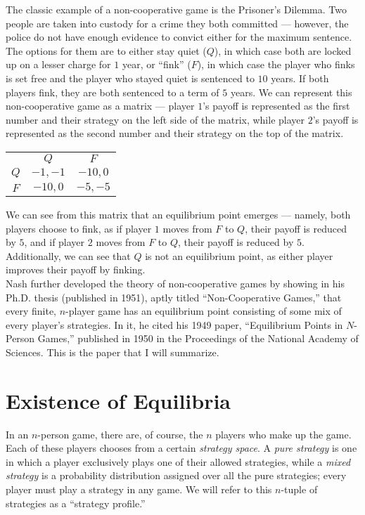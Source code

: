 \documentclass[12pt]{extarticle}
\begin{document}
  The classic example of a non-cooperative game is the Prisoner's Dilemma. Two people are taken into custody for a crime they both committed --- however, the police do not have enough evidence to convict either for the maximum sentence. The options for them are to either stay quiet ($Q$), in which case both are locked up on a lesser charge for $1$ year, or ``fink'' ($F$), in which case the player who finks is set free and the player who stayed quiet is sentenced to $10$ years. If both players fink, they are both sentenced to a term of $5$ years. We can represent this non-cooperative game as a matrix --- player $1$'s payoff is represented as the first number and their strategy on the left side of the matrix, while player $2$'s payoff is represented as the second number and their strategy on the top of the matrix.
  \begin{center}
    \begin{tabular}{c|c|c|}
      \multicolumn{1}{c}{} & \multicolumn{1}{c}{$Q$} & \multicolumn{1}{c}{$F$}\\
      \cline{2-3}
      $Q$ & $-1,-1$ & $-10,0$\\
      \cline{2-3}
      $F$ & $-10,0$ & $-5,-5$\\
      \cline{2-3}
    \end{tabular}
  \end{center}
  We can see from this matrix that an equilibrium point emerges --- namely, both players choose to fink, as if player $1$ moves from $F$ to $Q$, their payoff is reduced by $5$, and if player $2$ moves from $F$ to $Q$, their payoff is reduced by $5$. Additionally, we can see that $Q$ is not an equilibrium point, as either player improves their payoff by finking.\\

  Nash further developed the theory of non-cooperative games by showing in his Ph.D. thesis (published in 1951), aptly titled ``Non-Cooperative Games,''\supercite{nash_non-cooperative_1951} that every finite, $n$-player game has an equilibrium point consisting of some mix of every player's strategies. In it, he cited his 1949 paper, ``Equilibrium Points in $N$-Person Games,''\supercite{nash_equilibrium_1950} published in 1950 in the Proceedings of the National Academy of Sciences. This is the paper that I will summarize.
  \section*{Existence of Equilibria}%
  In an $n$-person game, there are, of course, the $n$ players who make up the game. Each of these players chooses from a certain \textit{strategy space}. A \textit{pure strategy} is one in which a player exclusively plays one of their allowed strategies, while a \textit{mixed strategy} is a probability distribution assigned over all the pure strategies; every player must play a strategy in any game. We will refer to this $n$-tuple of strategies as a ``strategy profile.''\\
\end{document}
